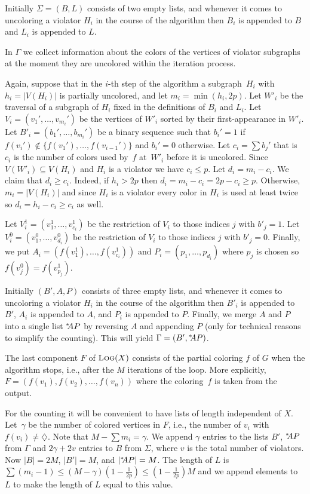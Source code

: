 \documentclass[11pt]{article}
\begin{document}
Initially $\Sigma=(B,L)$ consists of two empty lists, and whenever
it comes to uncoloring a violator $H_i$ in the course of the algorithm
then $B_i$ is appended to $B$ and $L_i$ is appended to $L$.

In $\Gamma$ we collect information about the colors of the vertices
of violator subgraphs at the moment they are uncolored within the iteration process.


Again, suppose that in the $i$-th step of the algorithm a
subgraph~$H_i$ with $h_i=|V(H_i)|$ is partially uncolored, and let
$m_i=\min(h_i,2p)$.  Let $W'_i$ be the traversal of a subgraph of
$H_i$ fixed in the definitions of $B_i$ and $L_i$.  Let
$V_i=(v_1',\ldots,v_{m_i}')$ be the vertices of $W'_i$ sorted by their
first-appearance in $W'_i$.  Let $B'_i=(b_1',\ldots,b_{m_i}')$ be a
binary sequence such that $b_i'=1$ if
$f(v_i')\not\in\{f(v_1'),\ldots,f(v_{i-1}')\}$ and $b_i'=0$
otherwise.  Let $c_i=\sum b_j'$ that is $c_i$ is the number of colors
used by~$f$ at~$W'_i$ before it is uncolored.  Since
$V(W'_i)\subseteq V(H_i)$ and $H_i$ is a violator we have
$c_i \leq p$.  Let $d_i = m_i - c_i$.  We claim that $d_i\geq c_i$.
Indeed, if $h_i > 2p$ then $d_i=m_i-c_i = 2p-c_i \geq p$.  Otherwise,
$m_i=|V(H_i)|$ and since $H_i$ is a violator every color in $H_i$ is
used at least twice so $d_i =h_i - c_i\geq c_i$ as well.

Let
$V_i^{1} = (v^1_1,\ldots,v^1_{c_i})$ be the restriction of $V_i$ to
those indices $j$ with $b'_j=1$.  Let
$V_i^{0} = (v^0_1,\ldots,v^0_{d_i})$ be the restriction of $V_i$ to
those indices $j$ with $b'_j=0$.  Finally, we put
$A_i=(f(v^1_1),\ldots,f(v^1_{c_i}))$ and $P_i=(p_1,\ldots,p_{d_i})$
where $p_j$ is chosen so $f(v^0_j) = f(v^1_{p_j})$.

Initially $(B',A,P)$ consists of three empty lists, and whenever
it comes to uncoloring a violator $H_i$ in the course of the algorithm
then $B'_i$ is appended to $B'$, $A_i$ is appended to $A$, and
$P_i$ is appended to $P$. Finally, we  merge $A$ and $P$ into 
a single list ${}^{*}\kern-3pt AP$ by reversing $A$ and appending $P$ 
(only for technical reasons to simplify the counting). 
This will yield $\Gamma=(B',{}^{*}\kern-3pt AP)$.
\medskip

The last component $F$ of $\text{\scshape Log}(X)$ consists of the partial coloring
$f$ of $G$ when the algorithm stops, i.e., after the $M$ iterations of
the loop. More explicitly, $F = (f(v_1),f(v_2),\ldots,f(v_n))$ where 
the coloring~$f$ is taken from the output.

For the counting it will be convenient to have lists of length independent 
of $X$. Let~$\gamma$ be the number of colored vertices in $F$, 
i.e., the number of $v_i$ with $f(v_i)\neq\diamondsuit$.
Note that $M-\sum m_i = \gamma$. 
We append $\gamma$ entries to the lists $B'$, ${}^{*}\kern-3pt AP$ from $\Gamma$
and $2\gamma+2v$ entries to $B$ from $\Sigma$, 
where $v$ is the total number of violators.
Now $|B| = 2M$, $|B'|=M$, and $|{}^{*}\kern-3pt AP|=M$.
The length of $L$ is $\sum (m_i-1) \leq (M - \gamma)\left(1-\frac{1}{2p}\right) \leq \left(1-\frac{1}{2p}\right)M$ and
we append elements to $L$ to make the length of
$L$ equal to this value.
\end{document}

